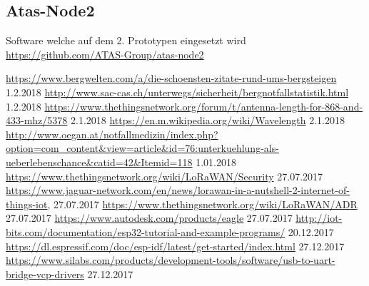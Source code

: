 \documentclass[11pt,english,german]{report}
\theoremstyle{definition}
\begin{document}
\subsection{Atas-Node2}
Software welche auf dem 2. Prototypen eingesetzt wird\\
\url{https://github.com/ATAS-Group/atas-node2}



\printglossaries

\listoffigures

\begin{thebibliography}{1}
	 \url{https://www.bergwelten.com/a/die-schoensten-zitate-rund-ums-bergsteigen} 1.2.2018
	 \url{http://www.sac-cas.ch/unterwegs/sicherheit/bergnotfallstatistik.html} 1.2.2018
	 \url{https://www.thethingsnetwork.org/forum/t/antenna-length-for-868-and-433-mhz/5378} 2.1.2018
	 \url{https://en.m.wikipedia.org/wiki/Wavelength} 2.1.2018\\
	 \url{http://www.oegan.at/notfallmedizin/index.php?option=com_content&view=article&id=76:unterkuehlung-als-ueberlebenschance&catid=42&Itemid=118} 1.01.2018
	 \url{https://www.thethingsnetwork.org/wiki/LoRaWAN/Security} 27.07.2017
	 \url{https://www.jaguar-network.com/en/news/lorawan-in-a-nutshell-2-internet-of-things-iot}, 27.07.2017
	 \url{https://www.thethingsnetwork.org/wiki/LoRaWAN/ADR} 27.07.2017
	 \url{https://www.autodesk.com/products/eagle} 27.07.2017
	 \url{http://iot-bits.com/documentation/esp32-tutorial-and-example-programs/} 20.12.2017
	 \url{https://dl.espressif.com/doc/esp-idf/latest/get-started/index.html} 27.12.2017
	 \url{https://www.silabs.com/products/development-tools/software/usb-to-uart-bridge-vcp-drivers} 27.12.2017
\end{thebibliography}
\end{document}
